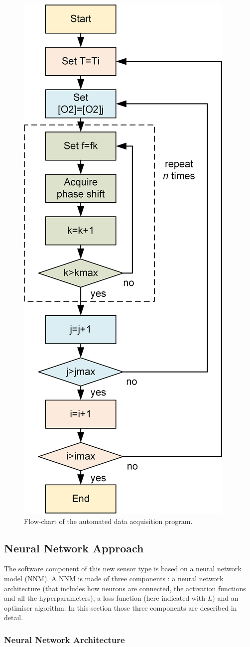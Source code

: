 \documentclass[9pt,twocolumn,twoside,pdftex]{optica}
\begin{document}
\begin{figure}[t!]
\centering
\includegraphics[keepaspectratio, width=5.9 cm]{flow-chart.png}
\caption{Flow-chart of the automated data acquisition program.}
\label{fig:auto-data}
\end{figure}


\subsection{Neural Network Approach}
\label{NN}

The software component of this new sensor type is based on a neural network model (NNM). A NNM is made of three components \cite{Michelucci2017}: a neural network architecture (that includes how neurons are connected, the activation functions and all the hyperparameters), a loss function (here indicated with $L$) and an optimiser algorithm. In this section those three components are described in detail.

\subsubsection{Neural Network Architecture}
\end{document}

